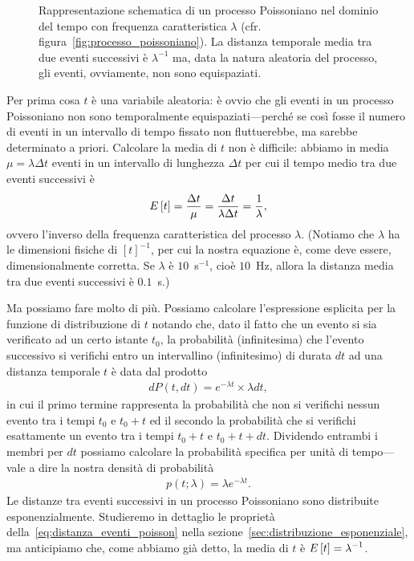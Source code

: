 \begin{figure}[htb!]
  \begin{center}
    
  \end{center}
  \caption{Rappresentazione schematica di un processo Poissoniano nel dominio
    del tempo con frequenza caratteristica $\lambda$
    (cfr. figura~\ref{fig:processo_poissoniano}). La distanza temporale media
    tra due eventi successivi è $\lambda^{-1}$ ma, data la natura aleatoria
    del processo, gli eventi, ovviamente, non sono equispaziati.
  }
  \label{fig:processo_poissoniano_exp}
\end{figure}

Per prima cosa $t$ è una variabile aleatoria: è ovvio che gli eventi
in un processo Poissoniano non sono temporalmente equispaziati---perché se
così fosse il numero di eventi in un intervallo di tempo fissato non
fluttuerebbe, ma sarebbe determinato a priori. Calcolare la media di $t$ non
è difficile: abbiamo in media $\mu = \lambda \Delta t$ eventi in un intervallo
di lunghezza $\Delta t$ per cui il tempo medio tra due eventi successivi
è
\begin{align*}
  \displaystyle E\left[t\right] = \frac{\Delta t}{\mu} = \frac{\Delta t}{\lambda \Delta t} =
  \frac{1}{\lambda},
\end{align*}
ovvero l'inverso della frequenza caratteristica del processo $\lambda$.
(Notiamo che $\lambda$ ha le dimensioni fisiche di $[t]^{-1}$, per cui la
nostra equazione è, come deve essere, dimensionalmente corretta. Se
$\lambda$ è $10$~s$^{-1}$, cioè $10$~Hz, allora la distanza media tra
due eventi successivi è $0.1$~s.)

Ma possiamo fare molto di più. Possiamo calcolare l'espressione esplicita per
la funzione di distribuzione di $t$ notando che, dato il fatto che un evento
si sia verificato ad un certo istante $t_0$, la probabilità (infinitesima) che
l'evento successivo si verifichi entro un intervallino (infinitesimo) di
durata $dt$ ad una distanza temporale $t$ è data dal prodotto
\begin{align*}
  dP(t, dt) = e^{-\lambda t} \times \lambda dt,
\end{align*}
in cui il primo termine rappresenta la probabilità che non si verifichi nessun
evento tra i tempi $t_0$ e $t_0 + t$ ed il secondo la probabilità che si
verifichi esattamente un evento tra i tempi $t_0 + t$ e $t_0 + t + dt$.
Dividendo entrambi i membri per $dt$ possiamo calcolare la probabilità
specifica per unità di tempo---vale a dire la nostra densità di
probabilità
\begin{align}\label{eq:distanza_eventi_poisson}
  p(t;\lambda) = \lambda e^{-\lambda t}.
\end{align}
Le distanze tra eventi successivi in un processo Poissoniano sono distribuite
esponenzialmente. Studieremo in dettaglio le proprietà
della~\eqref{eq:distanza_eventi_poisson} nella
sezione~\ref{sec:distribuzione_esponenziale}, ma anticipiamo che, come abbiamo
già detto, la media di $t$ è $\displaystyle E\left[t\right] = \lambda^{-1}$.


